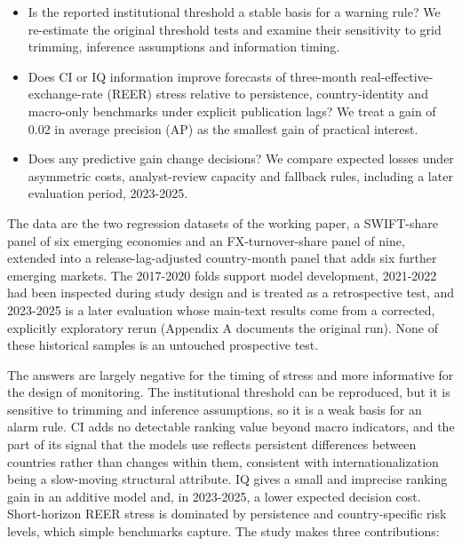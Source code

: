 \documentclass[preprint,12pt,authoryear]{elsarticle}
\begin{document}
\begin{itemize}
\item Is the reported institutional threshold a stable basis for a warning rule? We re-estimate the original threshold tests and examine their sensitivity to grid trimming, inference assumptions and information timing.
\item Does CI or IQ information improve forecasts of three-month real-effective-exchange-rate (REER) stress relative to persistence, country-identity and macro-only benchmarks under explicit publication lags? We treat a gain of 0.02 in average precision (AP) as the smallest gain of practical interest.
\item Does any predictive gain change decisions? We compare expected losses under asymmetric costs, analyst-review capacity and fallback rules, including a later evaluation period, 2023-2025.
\end{itemize}
The data are the two regression datasets of the working paper, a SWIFT-share panel of six emerging economies and an FX-turnover-share panel of nine, extended into a release-lag-adjusted country-month panel that adds six further emerging markets. The 2017-2020 folds support model development, 2021-2022 had been inspected during study design and is treated as a retrospective test, and 2023-2025 is a later evaluation whose main-text results come from a corrected, explicitly exploratory rerun (Appendix A documents the original run). None of these historical samples is an untouched prospective test.

The answers are largely negative for the timing of stress and more informative for the design of monitoring. The institutional threshold can be reproduced, but it is sensitive to trimming and inference assumptions, so it is a weak basis for an alarm rule. CI adds no detectable ranking value beyond macro indicators, and the part of its signal that the models use reflects persistent differences between countries rather than changes within them, consistent with internationalization being a slow-moving structural attribute. IQ gives a small and imprecise ranking gain in an additive model and, in 2023-2025, a lower expected decision cost. Short-horizon REER stress is dominated by persistence and country-specific risk levels, which simple benchmarks capture. The study makes three contributions:
\end{document}
